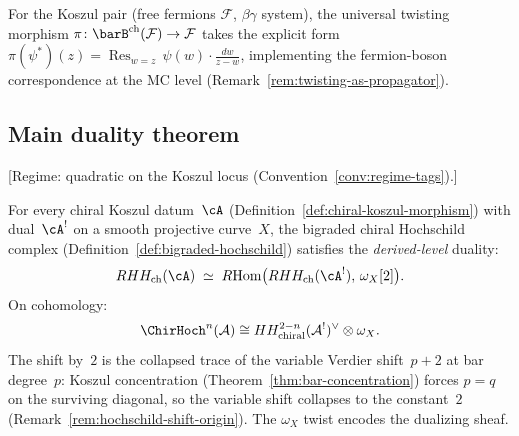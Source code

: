 \begin{example}
\label{ex:fermion-boson-twisting}
For the Koszul pair (free fermions $\mathcal{F}$, $\beta\gamma$
system), the universal twisting morphism
$\pi\colon \barB^{\mathrm{ch}}(\mathcal{F}) \to \mathcal{F}$
takes the explicit form
$\pi(\psi^*)(z) = \operatorname{Res}_{w=z}\, \psi(w) \cdot \frac{dw}{z-w}$,
implementing the fermion-boson correspondence at the MC level
(Remark~\ref{rem:twisting-as-propagator}).
\end{example}

\subsection{Main duality theorem}\label{subsec:hochschild-duality}

\begin{theorem}
\label{thm:main-koszul-hoch}
\textup{[Regime: quadratic on the Koszul locus
\textup{(}Convention~\textup{\ref{conv:regime-tags})}.]}

For every chiral Koszul datum~$\cA$
\textup{(}Definition~\textup{\ref{def:chiral-koszul-morphism})} with
dual~$\cA^!$ on a smooth projective curve~$X$, the bigraded chiral
Hochschild complex
\textup{(}Definition~\textup{\ref{def:bigraded-hochschild})} satisfies
the \emph{derived-level} duality:
\begin{equation}\label{eq:hochschild-H-derived}
RHH_{\mathrm{ch}}(\cA)
\;\simeq\;
R\mathrm{Hom}\bigl(RHH_{\mathrm{ch}}(\cA^!),\, \omega_X[2]\bigr).
\end{equation}
On cohomology:
\[
\ChirHoch^n(\mathcal{A}) \cong HH^{2-n}_{\mathrm{chiral}}(\mathcal{A}^!)^{\vee} \otimes \omega_X.
\]
The shift by~$2$ is the collapsed trace of the variable Verdier
shift~$p+2$ at bar degree~$p$: Koszul concentration
\textup{(}Theorem~\textup{\ref{thm:bar-concentration})} forces
$p = q$ on the surviving diagonal, so the variable
shift collapses to the constant~$2$
\textup{(}Remark~\textup{\ref{rem:hochschild-shift-origin})}.
The $\omega_X$ twist encodes the dualizing sheaf.
\end{theorem}

